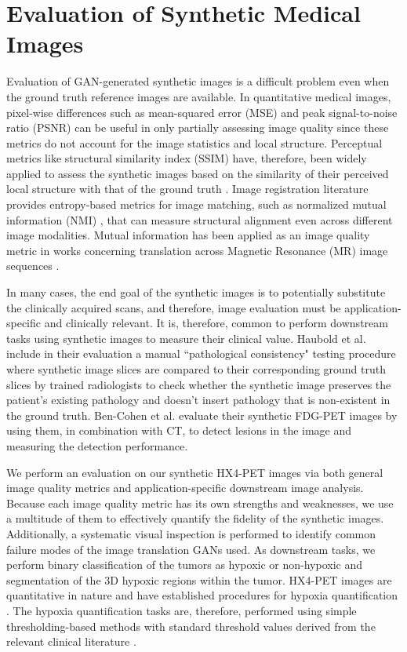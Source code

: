 \section{Evaluation of Synthetic Medical Images}

Evaluation of GAN-generated synthetic images is a difficult problem even when the ground truth reference images are available. In quantitative medical images, pixel-wise differences such as mean-squared error (MSE) and peak signal-to-noise ratio (PSNR) can be useful in only partially assessing image quality since these metrics do not account for the image statistics and local structure. Perceptual metrics like structural similarity index (SSIM) have, therefore, been widely applied to assess the synthetic images based on the similarity of their perceived local structure with that of the ground truth \cite{yi2019generative}. Image registration literature provides entropy-based metrics for image matching, such as normalized mutual information (NMI) \cite{studholme1999overlap}, that can measure structural alignment even across different image modalities. Mutual information has been applied as an image quality metric in works concerning translation across Magnetic Resonance (MR) image sequences \cite{yang2018mri, welander2018generative}. 

In many cases, the end goal of the synthetic images is to potentially substitute the clinically acquired scans, and therefore, image evaluation must be application-specific and clinically relevant. It is, therefore, common to perform downstream tasks using synthetic images to measure their clinical value. Haubold et al. \cite{haubold2021contrast} include in their evaluation a manual ``pathological consistency" testing procedure where synthetic image slices are compared to their corresponding ground truth slices by trained radiologists to check whether the synthetic image preserves the patient's existing pathology and doesn't insert pathology that is non-existent in the ground truth. Ben-Cohen et al. \cite{bencohen2018crossmodality} evaluate their synthetic FDG-PET images by using them, in combination with CT, to detect lesions in the image and measuring the detection performance.  

We perform an evaluation on our synthetic HX4-PET images via both general image quality metrics and application-specific downstream image analysis. Because each image quality metric has its own strengths and weaknesses, we use a multitude of them to effectively quantify the fidelity of the synthetic images. Additionally, a systematic visual inspection is performed to identify common failure modes of the image translation GANs used. As downstream tasks, we perform binary classification of the tumors as hypoxic or non-hypoxic and segmentation of the 3D hypoxic regions within the tumor. HX4-PET images are quantitative in nature and have established procedures for hypoxia quantification \cite{zegers2013hypoxia}. The hypoxia quantification tasks are, therefore, performed using simple thresholding-based methods with standard threshold values derived from the relevant clinical literature \cite{zegers2013hypoxia, even2017predicting}.